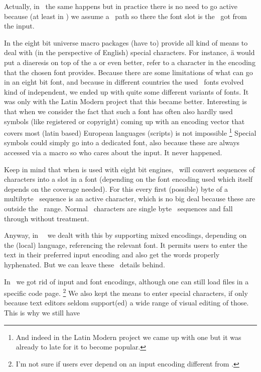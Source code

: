 Actually, in \LUATEX\ the same happens but in practice there is no need to go
active because (at least in \CONTEXT) we assume a \UNICODE\ path so there the
font slot is the \UNICODE\ got from the  input.

In the eight bit universe macro packages (have to) provide all kind of means to
deal with (in the perspective of English) special characters. For instance, \type
{\"a} would put a diaeresis on top of the a or even better, refer to a character
in the encoding that the chosen font provides. Because there are some limitations
of what can go in an eight bit font, and because in different countries the used
\TEX\ fonts evolved kind of independent, we ended up with quite some different
variants of fonts. It was only with the Latin Modern project that this became
better. Interesting is that when we consider the fact that such a font has often
also hardly used symbols (like registered or copyright) coming up with an
encoding vector that covers most (latin based) European languages (scripts) is
not impossible \footnote {And indeed in the Latin Modern project we came up with
one but it was already to late for it to become popular.} Special symbols could
simply go into a dedicated font, also because these are always accessed via a
macro so who cares about the input. It never happened.

Keep in mind that when  is used with eight bit engines, \CONTEXT\ will
convert sequences of characters into a slot in a font (depending on the font
encoding used which itself depends on the coverage needed). For this every first
(possible) byte of a multibyte \UTF\ sequence is an active character, which is no
big deal because these are outside the \ASCII\ range. Normal \ASCII\ characters
are single byte \UTF\ sequences and fall through without treatment.

Anyway, in \CONTEXT\ \MKII\ we dealt with this by supporting mixed encodings,
depending on the (local) language, referencing the relevant font. It permits
users to enter the text in their preferred input encoding and also get the words
properly hyphenated. But we can leave these \MKII\ details behind.

\stopsection

\startsection[title=The heritage]

In \MKIV\ we got rid of input and font encodings, although one can still load
files in a specific code page. \footnote {I'm not sure if users ever depend on an
input encoding different from .} We also kept the means to enter special
characters, if only because text editors seldom support(ed) a wide range of
visual editing of those. This is why we still have

